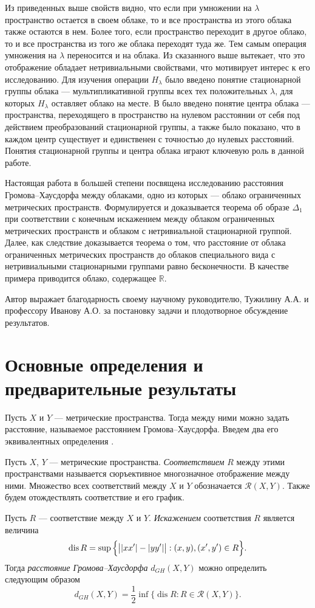 \documentclass[11pt,twoside,draft
]{article}
\DeclareMathOperator{\dis}{dis}
\begin{document}
Из приведенных выше свойств видно, что если при умножении на $\lambda$ пространство остается в своем облаке, то и все пространства из этого облака также остаются в нем. 
Более того, если пространство переходит в другое облако, то и все пространства из того же облака переходят туда же.
Тем самым операция умножения на $\lambda$ переносится и на облака. 
Из сказанного выше вытекает, что это отображение обладает нетривиальными свойствами, что мотивирует интерес к его исследованию.
Для изучения операции $H_\lambda$ было введено понятие стационарной группы облака --- мультипликативной группы всех тех положительных 
$\lambda$, для которых $H_\lambda$ оставляет облако на месте. В \cite{TuzhBog2} было введено понятие центра облака --- пространства, переходящего в пространство на нулевом расстоянии от себя под действием преобразований стационарной группы, а также было показано, что в каждом центр существует и единственен с точностью до нулевых расстояний. Понятия стационарной группы и центра облака играют ключевую роль в данной работе.

Настоящая работа в большей степени посвящена исследованию расстояния Громова--Хаусдорфа между облаками, одно из которых --- облако ограниченных метрических пространств. Формулируется и доказывается теорема об образе $\Delta_1$ при соответствии с конечным искажением между облаком ограниченных метрических пространств и облаком с нетривиальной стационарной группой. 
Далее, как следствие доказывается теорема о том, что расстояние от облака ограниченных метрических пространств до облаков специального вида с нетривиальными стационарными группами равно бесконечности. В качестве примера приводится облако, содержащее $\mathbb{R}$.

Автор выражает благодарность своему научному руководителю, Тужилину А.А. и профессору Иванову А.О. за постановку задачи и плодотворное обсуждение результатов.


\section{Основные определения и предварительные результаты} Пусть $X$ и $Y$ ---
метрические пространства. Тогда между ними можно задать расстояние, называемое
расстоянием Громова--Хаусдорфа. Введем два его эквивалентных 
определения \cite{Lectures}.
\begin{defin}
	Пусть $X$, $Y$ --- метрические пространства. \emph{Соответствием} $R$ между этими пространствами
	называется сюръективное многозначное отображение между ними.
	Множество всех соответствий между $X$ и $Y$ обозначается
	$\mathcal{R}(X,Y)$. Также будем отождествлять соответствие и его график.
\end{defin}
\begin{defin}
	Пусть $R$ --- соответствие между $X$ и $Y$.
	\emph{Искажением} соответствия $R$ является величина
	$$ \dis{R} = \sup{\Bigl\{ \big| |xx'| - |yy'| \big| : (x, y), (x', y') \in R\Bigr\}}.$$
	Тогда \emph{расстояние Громова--Хаусдорфа} $d_{GH}(X,Y)$ можно определить
	следующим образом
	$$ d_{GH}(X,Y) = \frac{1}{2}\inf \bigl\{\dis{R} : R \in \mathcal{R}(X,Y)\bigr\}.$$
	\label{defSootvet}
\end{defin}
\end{document}

